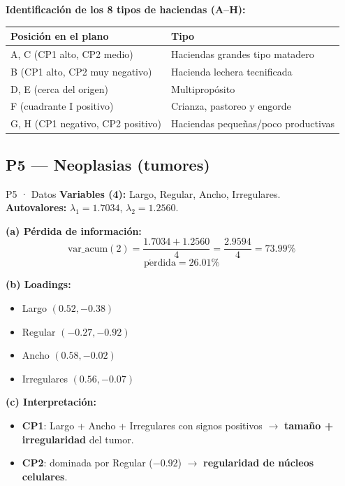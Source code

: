 \documentclass[11pt,a4paper]{article}
\begin{document}
\textbf{Identificación de los 8 tipos de haciendas (A--H):}\\
\begin{center}\small
\begin{tabular}{ll}
\toprule
Posición en el plano & Tipo \\
\midrule
A, C (CP1 alto, CP2 medio) & Haciendas grandes tipo matadero \\
B (CP1 alto, CP2 muy negativo) & Hacienda lechera tecnificada \\
D, E (cerca del origen) & Multipropósito \\
F (cuadrante I positivo) & Crianza, pastoreo y engorde \\
G, H (CP1 negativo, CP2 positivo) & Haciendas pequeñas/poco productivas \\
\bottomrule
\end{tabular}
\end{center}

\hrulefill

\subsection{P5 — Neoplasias (tumores)}

\begin{ejerciciobox}{P5 · Datos}
\textbf{Variables (4):} Largo, Regular, Ancho, Irregulares.\\
\textbf{Autovalores:} $\lambda_1=1.7034$, $\lambda_2=1.2560$.
\end{ejerciciobox}

\textbf{(a) Pérdida de información:}
\[
\mathrm{var\_acum}(2) = \frac{1.7034+1.2560}{4} = \frac{2.9594}{4} = 73.99\%
\]
\[
\boxed{\;\mathrm{p\acute{e}rdida} = 26.01\%\;}
\]

\textbf{(b) Loadings:}
\begin{itemize}[leftmargin=*]
    \item Largo $(0.52, -0.38)$
    \item Regular $(-0.27, -0.92)$
    \item Ancho $(0.58, -0.02)$
    \item Irregulares $(0.56, -0.07)$
\end{itemize}

\textbf{(c) Interpretación:}
\begin{itemize}[leftmargin=*]
    \item \textbf{CP1}: Largo + Ancho + Irregulares con signos positivos $\to$ \textbf{tamaño + irregularidad} del tumor.
    \item \textbf{CP2}: dominada por Regular ($-0.92$) $\to$ \textbf{regularidad de núcleos celulares}.
\end{itemize}
\end{document}
